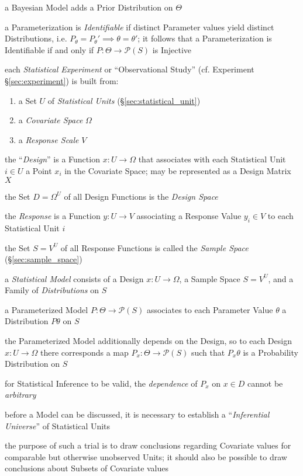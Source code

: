 a Bayesian Model adds a Prior Distribution on $\Theta$

a Parameterization is \emph{Identifiable} if distinct Parameter values yield
distinct Distributions, i.e. $P_\theta = P_\theta' \implies \theta = \theta'$;
it follows that a Parameterization is Identifiable if and only if
$P : \Theta \to \mathcal{P}(S)$ is Injective

each \emph{Statistical Experiment} or ``Observational Study'' (cf. Experiment
\S\ref{sec:experiment}) is built from:
\begin{enumerate}
  \item a Set $U$ of \emph{Statistical Units} (\S\ref{sec:statistical_unit})
  \item a \emph{Covariate Space} $\Omega$
  \item a \emph{Response Scale} $V$
\end{enumerate}

the ``\emph{Design}'' is a Function $x : U \to \Omega$ that associates with each
Statistical Unit $i \in U$ a Point $x_i$ in the Covariate Space; may be
represented as a Design Matrix $X$

the Set $D = \Omega^U$ of all Design Functions is the \emph{Design Space}

the \emph{Response} is a Function $y : U \to V$ associating a Response Value
$y_i \in V$ to each Statistical Unit $i$

the Set $S = V^U$ of all Response Functions is called the \emph{Sample Space}
(\S\ref{sec:sample_space})

a \emph{Statistical Model} consists of a Design $x : U \to \Omega$, a Sample
Space $S = V^U$, and a Family of \emph{Distributions} on $S$

a Parameterized Model $P : \Theta \to \mathcal{P}(S)$ associates to each
Parameter Value $\theta$ a Distribution $P\theta$ on $S$

the Parameterized Model additionally depends on the Design, so to each Design
$x : U \to \Omega$ there corresponds a map $P_x : \Theta \to \mathcal{P}(S)$
such that $P_x\theta$ is a Probability Distribution on $S$

for Statistical Inference to be valid, the \emph{dependence} of $P_x$ on
$x \in D$ cannot be \emph{arbitrary}

before a Model can be discussed, it is necessary to establish a
``\emph{Inferential Universe}'' of Statistical Units

the purpose of such a trial is to draw conclusions regarding Covariate values
for comparable but otherwise unobserved Units; it should also be possible to
draw conclusions about Subsets of Covariate values

